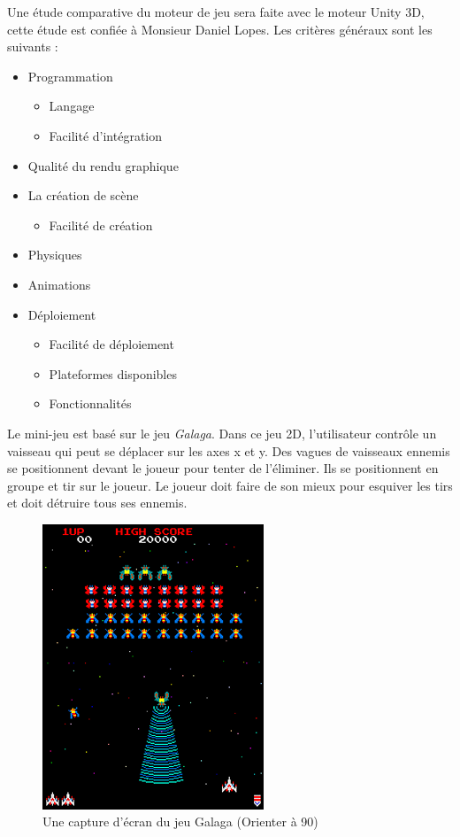 \documentclass[11pt, a4paper]{article}
\begin{document}
Une étude comparative du moteur de jeu sera faite avec le moteur Unity 3D, cette étude est confiée à Monsieur Daniel Lopes. Les critères généraux sont les suivants :\\

\begin{itemize}
\item Programmation
	\begin{itemize}
	\item Langage
	\item Facilité d'intégration
	\end{itemize}
\item Qualité du rendu graphique
\item La création de scène
	\begin{itemize}
	\item Facilité de création
	\end{itemize}
\item Physiques
\item Animations
\item Déploiement
	\begin{itemize}
	\item Facilité de déploiement
	\item Plateformes disponibles
	\item Fonctionnalités\\
	\end{itemize}
\end{itemize}

Le mini-jeu est basé sur le jeu \textit{Galaga}. Dans ce jeu 2D, l'utilisateur contrôle un vaisseau qui peut se déplacer sur les axes x et y. Des vagues de vaisseaux ennemis se positionnent devant le joueur pour tenter de l'éliminer. Ils se positionnent en groupe et tir sur le joueur. Le joueur doit faire de son mieux pour esquiver les tirs et doit détruire tous ses ennemis. 

\begin{figure}[H]
	\begin{center}
	\includegraphics[scale=.9, angle=90]{Galaga}
	\caption{Une capture d'écran du jeu Galaga (Orienter à 90\degre)}
	\end{center}
\end{figure}
\end{document}
